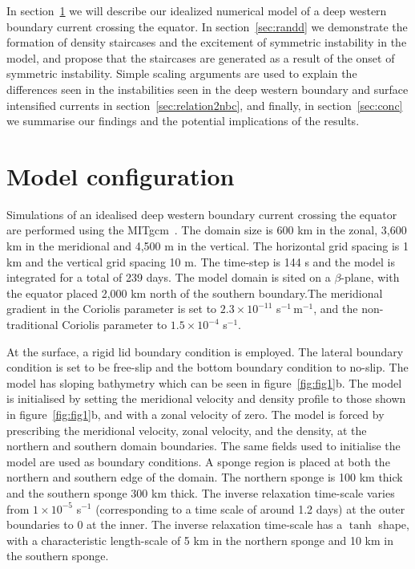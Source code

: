 In section~\ref{sec:methods} we will describe our idealized numerical model of a deep western boundary current crossing the equator. In section~\ref{sec:randd} we demonstrate the formation of density staircases and the excitement of symmetric instability in the model, and propose that the staircases are generated as a result of the onset of symmetric instability. Simple scaling arguments are used to explain the differences seen in the instabilities seen in the deep western boundary and surface intensified currents in section~\ref{sec:relation2nbc}, and finally, in section~\ref{sec:conc} we summarise our findings and the potential implications of the results.

\section{Model configuration}
\label{sec:methods}
Simulations of an idealised deep western boundary current crossing the equator are performed using the MITgcm~\cite{mitgcm}. The domain size is 600 km in the zonal, 3,600 km in the meridional and 4,500 m in the vertical. The horizontal grid spacing is 1 km and the vertical grid spacing 10 m. The time-step is 144 s and the model is integrated for a total of 239 days. The model domain is sited on a $\beta$-plane, with the equator placed 2,000 km north of the southern boundary.The meridional gradient in the Coriolis parameter is set to $2.3 \times 10^{-11}$ s$^{-1}\,$m$^{-1}$, and the non-traditional Coriolis parameter to $1.5 \times 10^{-4}$ s$^{-1}$.

At the surface, a rigid lid boundary condition is employed. The lateral boundary condition is set to be free-slip and the bottom boundary condition to no-slip. The model has sloping bathymetry which can be seen in figure~\ref{fig:fig1}b. The model is initialised by setting the meridional velocity and density profile to those shown in figure~\ref{fig:fig1}b, and with a zonal velocity of zero. The model is forced by prescribing the meridional velocity, zonal velocity, and the density, at the northern and southern domain boundaries. The same fields used to initialise the model are used as boundary conditions. A sponge region is placed at both the northern and southern edge of the domain. The northern sponge is 100 km thick and the southern sponge 300 km thick. The inverse relaxation time-scale varies from $1\times 10^{-5}$ s$^{-1}$ (corresponding to a time scale of around 1.2 days) at the outer boundaries to 0 at the inner. The inverse relaxation time-scale has a $\tanh$ shape, with a characteristic length-scale of 5 km in the northern sponge and 10 km in the southern sponge.

